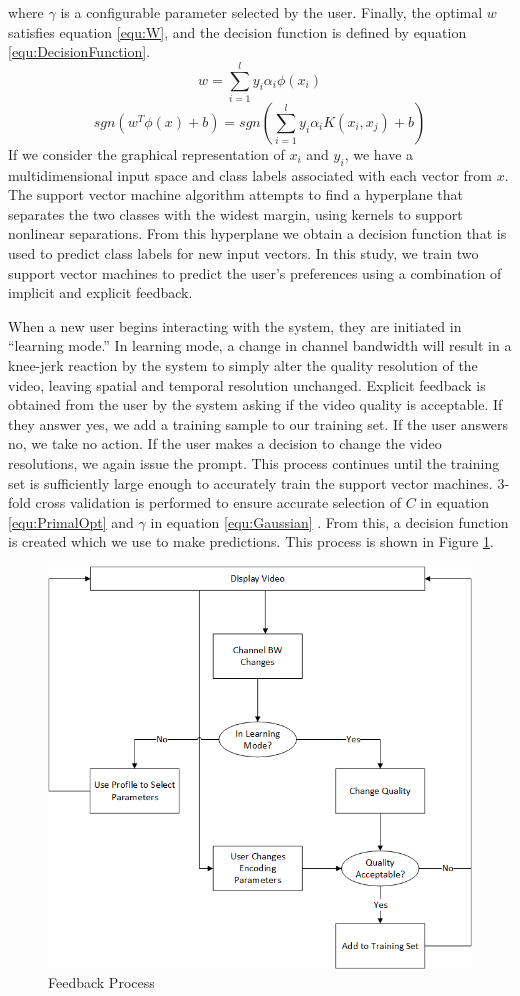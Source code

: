 \documentclass[a4paper,12pt]{article}
\begin{document}
where $\gamma$ is a configurable parameter selected by the user. Finally, the optimal $w$ satisfies equation \ref{equ:W}, and the decision function is defined by equation \ref{equ:DecisionFunction}.
\begin{equation}
\label{equ:W}
w = \sum_{i=1}^{l} y_i \alpha_i \phi (x_i)
\end{equation}
\begin{equation}
\label{equ:DecisionFunction}
sgn(w^T\phi (x) + b) = sgn(\sum_{i=1}^{l} y_i\alpha_i K(x_i, x_j) +b)
\end{equation}
If we consider the graphical representation of $x_i$ and $y_i$, we have a multidimensional input space and class labels associated with each vector from $x$. The support vector machine algorithm attempts to find a hyperplane that separates the two classes with the widest margin, using kernels to support nonlinear separations. From this hyperplane we obtain a decision function that is used to predict class labels for new input vectors. In this study, we train two support vector machines to predict the user’s preferences using a combination of implicit and explicit feedback. 

When a new user begins interacting with the system, they are initiated in ``learning mode.'' In learning mode, a change in channel bandwidth will result in a knee-jerk reaction by the system to simply alter the quality resolution of the video, leaving spatial and temporal resolution unchanged. Explicit feedback is obtained from the user by the system asking if the video quality is acceptable. If they answer yes, we add a training sample to our training set. If the user answers no, we take no action. If the user makes a decision to change the video resolutions, we again issue the prompt. This process continues until the training set is sufficiently large enough to accurately train the support vector machines. 3-fold cross validation is performed to ensure accurate selection of $C$ in equation \ref{equ:PrimalOpt} and $\gamma$ in equation \ref{equ:Gaussian} \cite{LibSVM}. From this, a decision function is created which we use to make predictions. This process is shown in Figure \ref{fig:Feedback}.
\begin{figure}[h]
\centering
\includegraphics[width=0.5\linewidth]{BandwidthChangeDecisionTree.png}
\caption{Feedback Process}
\label{fig:Feedback}
\end{figure}
\end{document}
